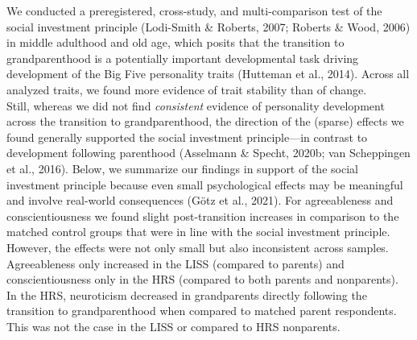 \documentclass[
  english,
  man, noextraspace,floatsintext]{apa7}
\begin{document}
We conducted a preregistered, cross-study, and multi-comparison test of the social investment principle (Lodi-Smith \& Roberts, 2007; Roberts \& Wood, 2006) in middle adulthood and old age, which posits that the transition to grandparenthood is a potentially important developmental task driving development of the Big Five personality traits (Hutteman et al., 2014). Across all analyzed traits, we found more evidence of trait stability than of change.\\
Still, whereas we did not find \emph{consistent} evidence of personality development across the transition to grandparenthood, the direction of the (sparse) effects we found generally supported the social investment principle---in contrast to development following parenthood (Asselmann \& Specht, 2020b; van Scheppingen et al., 2016). Below, we summarize our findings in support of the social investment principle because even small psychological effects may be meaningful and involve real-world consequences (Götz et al., 2021). For agreeableness and conscientiousness we found slight post-transition increases in comparison to the matched control groups that were in line with the social investment principle. However, the effects were not only small but also inconsistent across samples. Agreeableness only increased in the LISS (compared to parents) and conscientiousness only in the HRS (compared to both parents and nonparents). In the HRS, neuroticism decreased in grandparents directly following the transition to grandparenthood when compared to matched parent respondents. This was not the case in the LISS or compared to HRS nonparents.\\
\end{document}
